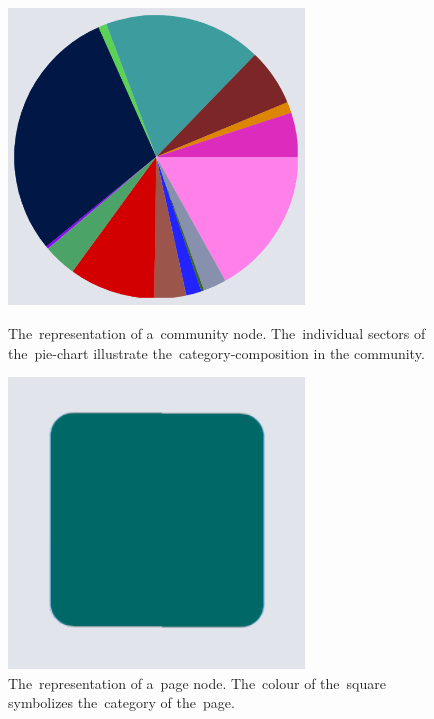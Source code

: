 \begin{figure} 
  \begin{minipage}[t]{0.45\textwidth}
    \centering
    \includegraphics[width=0.7\textwidth]{Images/community_node.png}
    \caption{The~representation of a~community node. The~individual sectors of the~pie-chart illustrate the~category-composition in the community.}
    \label{communityNodeRepresentation}
  \end{minipage} \hfill
  \begin{minipage}[t]{0.45\textwidth}
    \centering
    \includegraphics[width=0.7\textwidth]{Images/page_node.png}
    \caption{The~representation of a~page node. The~colour of the~square symbolizes the~category of the~page.}
    \label{pageNodeRepresentation}
  \end{minipage} 
\end{figure} 
